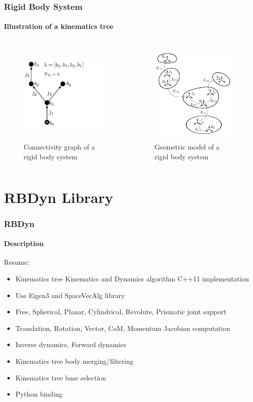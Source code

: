 \documentclass{beamer}
\begin{document}
\begin{frame}
\frametitle{Rigid Body System}
\framesubtitle{Illustration of a kinematics tree}
\begin{columns}[T]
	\begin{column}[T]{5cm}
		\begin{figure}
			\includegraphics[height=5cm]{img/robot1_graph.pdf}
			\caption{Connectivity graph of a rigid body system}
		\end{figure}
	\end{column}
	\begin{column}[T]{5cm}
		\begin{figure}
			\includegraphics[height=5cm]{img/robot1_illu.pdf}
			\caption{Geometric model of a rigid body system}
		\end{figure}
	\end{column}
	 \end{columns}
\end{frame}



\section{RBDyn Library}
\begin{frame}
\frametitle{RBDyn}
\framesubtitle{Description}
Resume:
\begin{itemize}
	\item Kinematics tree Kinematics and Dynamics algorithm C++11 implementation
	\item Use Eigen3 and SpaceVecAlg library
	\item Free, Spherical, Planar, Cylindrical, Revolute, Prismatic joint support
	\item Translation, Rotation, Vector, CoM, Momentum Jacobian computation
	\item Inverse dynamics, Forward dynamics
	\item Kinematics tree body merging/filtering
	\item Kinematics tree base selection
	\item Python binding
\end{itemize}
\end{frame}
\end{document}

